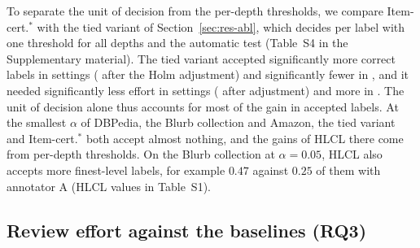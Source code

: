 \documentclass[preprint,12pt]{elsarticle}
\theoremstyle{definition}
\newcommand{\hlcl}{\textup{\textsc{HLCL}}}
\begin{document}
To separate the unit of decision from the per-depth thresholds, we compare
Item-cert.$^\ast$ with the tied variant of Section~\ref{sec:res-abl}, which
decides per label with one threshold for all depths and the automatic test
(Table~S4 in the Supplementary material). The tied variant accepted significantly more
correct labels in  settings
( after the Holm adjustment) and significantly fewer in
, and it needed significantly less effort in
 settings ( after
adjustment) and more in . The unit of decision alone
thus accounts for most of the gain in accepted labels. At the smallest $\alpha$
of DBPedia, the Blurb collection and Amazon, the tied variant and Item-cert.$^\ast$
both accept almost nothing, and the gains of \hlcl{} there come from per-depth
thresholds. On the Blurb collection at $\alpha=0.05$, \hlcl{} also accepts more
finest-level labels, for example $0.47$ against $0.25$ of them with annotator A
(\hlcl{} values in Table~S1).

\begin{table}[!tbp]
\centering
\footnotesize
\caption{Paired differences \hlcl{} $-$ Item-cert.$^\ast$ (same certificate,
decision per item) in power and effort over 100 splits: mean $\pm$ half-width
of the Nadeau--Bengio-corrected 95\% interval. Positive power and negative
effort differences favor \hlcl{}; bold marks significant differences in favor
of \hlcl{}. No difference is significant in favor of Item-cert.$^\ast$.}
\label{tab:itemcert}

\end{table}

\subsection{Review effort against the baselines (RQ3)}
\label{sec:res-effort}

\begin{table}[!tbp]
\centering
\footnotesize
\setlength{\tabcolsep}{2.5pt}
\caption{Effort of \hlcl{} against each baseline, over the settings in which the
baseline is on target (realized error above $\alpha$ in at most 10\% of splits).
Wins and losses are significant paired differences (Nadeau--Bengio-corrected
95\% intervals over 100 splits); Holm w/l counts those that remain after a Holm
adjustment over the settings. Reduction is the relative difference of the mean
efforts.}
\label{tab:perbaseline}

\end{table}
\end{document}

